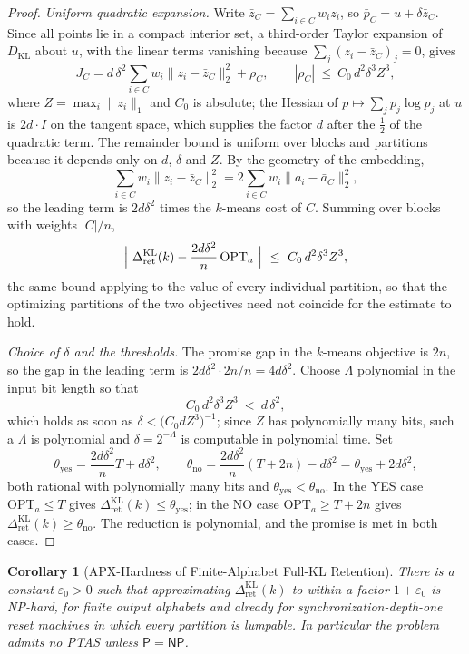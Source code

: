 \documentclass[12pt]{article}
\newtheorem{corollary}[theorem]{Corollary}
\theoremstyle{definition}
\newcommand{\RetKL}{\Delta_{\mathrm{ret}}^{\mathrm{KL}}}
\begin{document}
\begin{proof}
\emph{Uniform quadratic expansion.}  Write $\bar z_C=\sum_{i\in C}w_iz_i$, so
$\bar p_C=u+\delta\bar z_C$.  Since all points lie in a compact interior set,
a third-order Taylor expansion of $D_{\mathrm{KL}}$ about $u$, with the linear
terms vanishing because $\sum_j(z_i-\bar z_C)_j=0$, gives
\[
J_C
=
d\,\delta^2\sum_{i\in C}w_i\|z_i-\bar z_C\|_2^2
+
\rho_C,
\qquad
|\rho_C|\ \le\ C_0\,d^{2}\delta^{3}Z^{3},
\]
where $Z=\max_i\|z_i\|_1$ and $C_0$ is absolute; the Hessian of
$p\mapsto\sum_jp_j\log p_j$ at $u$ is $2d\cdot I$ on the tangent space, which
supplies the factor $d$ after the $\tfrac12$ of the quadratic term.  The
remainder bound is uniform over blocks and partitions because it depends only
on $d$, $\delta$ and $Z$.  By the geometry of the embedding,
\[
\sum_{i\in C}w_i\|z_i-\bar z_C\|_2^2
=
2\sum_{i\in C}w_i\|a_i-\bar a_C\|_2^2 ,
\]
so the leading term is $2d\delta^2$ times the $k$-means cost of $C$.
Summing over blocks with weights $|C|/n$,
\[
\Bigl|\ \RetKL(k)-\frac{2d\delta^2}{n}\,\mathrm{OPT}_a\ \Bigr|
\ \le\
C_0\,d^{2}\delta^{3}Z^{3},
\]
the same bound applying to the value of every individual partition, so that the
optimizing partitions of the two objectives need not coincide for the estimate
to hold.

\emph{Choice of $\delta$ and the thresholds.}  The promise gap in the
$k$-means objective is $2n$, so the gap in the leading term is
$2d\delta^2\cdot 2n/n=4d\delta^2$.  Choose $\Lambda$ polynomial in the input
bit length so that
\[
C_0\,d^{2}\delta^{3}Z^{3}\ <\ d\,\delta^{2},
\]
which holds as soon as $\delta<\bigl(C_0dZ^3\bigr)^{-1}$; since $Z$ has
polynomially many bits, such a $\Lambda$ is polynomial and $\delta=2^{-\Lambda}$
is computable in polynomial time.  Set
\[
\theta_{\mathrm{yes}}=\frac{2d\delta^2}{n}T+d\delta^2,
\qquad
\theta_{\mathrm{no}}=\frac{2d\delta^2}{n}(T+2n)-d\delta^2
=
\theta_{\mathrm{yes}}+2d\delta^{2},
\]
both rational with polynomially many bits and
$\theta_{\mathrm{yes}}<\theta_{\mathrm{no}}$.  In the YES case
$\mathrm{OPT}_a\le T$ gives $\RetKL(k)\le\theta_{\mathrm{yes}}$; in the NO case
$\mathrm{OPT}_a\ge T+2n$ gives $\RetKL(k)\ge\theta_{\mathrm{no}}$.  The
reduction is polynomial, and the promise is met in both cases.
\end{proof}

\begin{corollary}[APX-Hardness of Finite-Alphabet Full-KL Retention]
\label{cor:full-kl-apx}
There is a constant $\varepsilon_0>0$ such that approximating $\RetKL(k)$ to
within a factor $1+\varepsilon_0$ is NP-hard, for finite output alphabets and
already for synchronization-depth-one reset machines in which every partition
is lumpable.  In particular the problem admits no PTAS unless $\mathsf P=\mathsf{NP}$.
\end{corollary}
\end{document}
